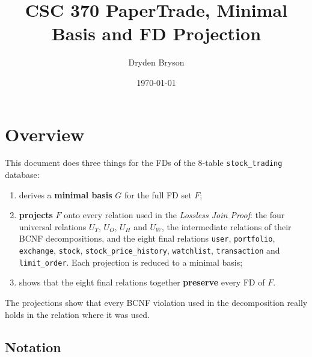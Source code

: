 \documentclass{article}
\title{CSC 370 PaperTrade, Minimal Basis and FD Projection}
\author{Dryden Bryson}
\date{\today}
\begin{document}
\maketitle
\newpage

\section*{Overview}

This document does three things for the FDs of the 8-table \texttt{stock\_trading} database:
\begin{enumerate}[leftmargin=*]
  \item derives a \textbf{minimal basis} $G$ for the full FD set $F$;
  \item \textbf{projects} $F$ onto every relation used in the \emph{Lossless Join Proof}: the four universal relations $U_T$, $U_O$, $U_H$ and $U_W$, the intermediate relations of their BCNF decompositions, and the eight final relations \texttt{user}, \texttt{portfolio}, \texttt{exchange}, \texttt{stock}, \texttt{stock\_price\_history}, \texttt{watchlist}, \texttt{transaction} and \texttt{limit\_order}. Each projection is reduced to a minimal basis;
  \item shows that the eight final relations together \textbf{preserve} every FD of $F$.
\end{enumerate}
The projections show that every BCNF violation used in the decomposition really holds in the relation where it was used.

\subsection*{Notation}
\end{document}

